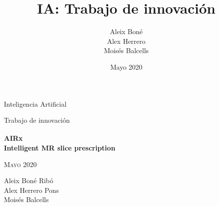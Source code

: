 

\usepackage[bottom]{footmisc}

\usepackage{amsmath}
\usepackage[justification=centering]{caption}

\title{%
IA: Trabajo de innovación
}

\author{%
    Aleix Boné\\
    Alex Herrero\\
    Moisés Balcells
}
\date{%
Mayo 2020
}

 


\thispagestyle{empty}
\clearpage
\setcounter{page}{-1}

\begin{titlepage}
{
    \centering
    \null
    \vfill
    {\Large Inteligencia Artificial\par}
    \vspace{2em}
    {\Huge 
    Trabajo de innovación \\
    \par}
    \vspace{1em}
    {\Huge\bfseries 
    AIRx\textsuperscript{\texttrademark}
    \\ Intelligent MR slice prescription
    \par}
    \vspace{2em}
    {\large \scshape 
    Mayo 2020
    \par}
    \vfill
\begin{center}
    
\end{center}
    \vspace{3cm}

    \vfill
    {\raggedleft \large
Aleix Boné Ribó\\
Alex Herrero Pons\\
    Moisés Balcells
        \par}
}
\end{titlepage}

\pagebreak

\thispagestyle{empty}
\clearpage
\setcounter{page}{0}

\tableofcontents

\pagebreak

%

